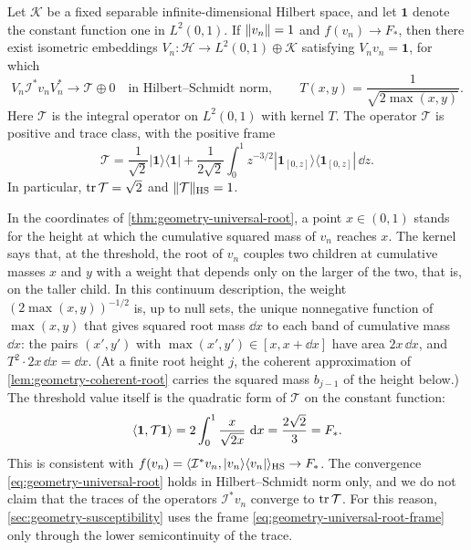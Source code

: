 \begin{theorem}
\label{thm:geometry-universal-root}
Let $\mathcal K$ be a fixed separable infinite-dimensional Hilbert space, and let $\mathbf1$ denote the constant function one in $L^2(0,1)$. If $\lVert v_n\rVert=1$ and $f(v_n)\to F_*$, then there exist isometric embeddings $V_n\colon\mathcal H\to L^2(0,1)\oplus\mathcal K$ satisfying $V_nv_n=\mathbf1$, for which
\begin{equation}
 V_n\mathcal I^*v_nV_n^*\longrightarrow\mathcal T\oplus0
 \quad\text{in Hilbert--Schmidt norm},
 \qquad
 T(x,y)=\frac1{\sqrt{2\max(x,y)}} .
 \label{eq:geometry-universal-root}
\end{equation}
Here $\mathcal T$ is the integral operator on $L^2(0,1)$ with kernel $T$. The operator $\mathcal T$ is positive and trace class, with the positive frame
\begin{equation}
 \mathcal T=\frac1{\sqrt2}|\mathbf1\rangle\langle\mathbf1|
 +\frac1{2\sqrt2}\int_0^1z^{-3/2}
 |\mathbf1_{[0,z]}\rangle\langle\mathbf1_{[0,z]}|\,\dd z .
 \label{eq:geometry-universal-root-frame}
\end{equation}
In particular, $\operatorname{tr}\mathcal T=\sqrt2$ and $\lVert\mathcal T\rVert_{\mathrm{HS}}=1$.
\end{theorem}

\begin{remark}\label{rem:geometry-universal-kernel}
In the coordinates of \cref{thm:geometry-universal-root}, a point $x\in(0,1)$ stands for the height at which the cumulative squared mass of $v_n$ reaches $x$. The kernel says that, at the threshold, the root of $v_n$ couples two children at cumulative masses $x$ and $y$ with a weight that depends only on the larger of the two, that is, on the taller child. In this continuum description, the weight $(2\max(x,y))^{-1/2}$ is, up to null sets, the unique nonnegative function of $\max(x,y)$ that gives squared root mass $\dd x$ to each band of cumulative mass $\dd x$: the pairs $(x',y')$ with $\max(x',y')\in[x,x+\dd x]$ have area $2x\,\dd x$, and $T^2\cdot2x\,\dd x=\dd x$. (At a finite root height $j$, the coherent approximation of \cref{lem:geometry-coherent-root} carries the squared mass $b_{j-1}$ of the height below.) The threshold value itself is the quadratic form of $\mathcal T$ on the constant function:
\[
 \left\langle\mathbf1,\mathcal T\mathbf1\right\rangle=2\int_0^1\frac{x}{\sqrt{2x}}\,\mathop{}\!\mathrm d x=\frac{2\sqrt2}3=F_* .
\]
This is consistent with $f(v_n)=\langle\mathcal I^*v_n,|v_n\rangle\langle v_n|\rangle_{\mathrm{HS}}\to F_*$. The convergence \eqref{eq:geometry-universal-root} holds in Hilbert--Schmidt norm only, and we do not claim that the traces of the operators $\mathcal I^*v_n$ converge to $\operatorname{tr}\mathcal T$. For this reason, \cref{sec:geometry-susceptibility} uses the frame \eqref{eq:geometry-universal-root-frame} only through the lower semicontinuity of the trace.
\end{remark}

